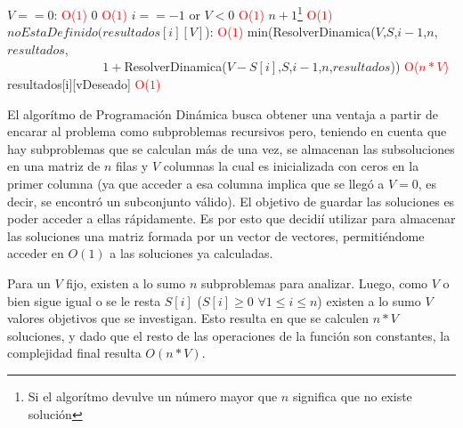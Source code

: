 \begin{codebox}
    \li \If $V == 0$: \textcolor{red}{O($1$)}
        \Then
         \li       \Return $0$ \textcolor{red}{O($1$)}
                \End
    \li \If $i == -1$ or $V<0$  \textcolor{red}{O($1$)}
        \Then
    \li                 \Return $n+1$\footnote{\label{bktrk}Si el algor\'itmo devulve un n\'umero mayor que $n$ significa que no existe soluci\'on} \textcolor{red}{O($1$)}
                \End
    \li \If $noEstaDefinido(resultados[i][V]$):  \textcolor{red}{O($1$)}
        \Then 
    \li          \Return min(ResolverDinamica($V$,$S$,$i-1$,$n$,$resultados$,
                            \\ $\qquad\qquad$$\qquad\quad\,\,$ $1+$ResolverDinamica($V-S[i]$,$S$,$i-1$,$n$,$resultados$)) \textcolor{red}{O($n*V$)}
                            \End
    \li \Return resultados[i][vDeseado]  \textcolor{red}{O($1$)}
    \end{codebox}
\par El algor\'itmo de Programaci\'on Din\'amica busca obtener una ventaja a partir de encarar al problema como
subproblemas recursivos pero, teniendo en cuenta que hay subproblemas que se calculan m\'as de una vez, se 
almacenan las subsoluciones  en una matriz de $n$ filas y $V$ columnas la cual es inicializada con ceros en
la primer columna (ya que acceder a esa columna implica que se lleg\'o a $V=0$, es decir, se encontr\'o un subconjunto v\'alido).
 El objetivo de guardar las soluciones es poder acceder a ellas
r\'apidamente. Es por esto que decidi\'i utilizar para almacenar las soluciones una matriz formada por un vector de 
vectores, permiti\'endome acceder en $O(1)$ a las soluciones ya calculadas.
\par Para un $V$ fijo, existen a lo sumo $n$ subproblemas para analizar. Luego, como $V$ o bien sigue igual o se le resta $S[i]$ ($S[i]\geq 0$ $\forall 1\leq i \leq n$)
existen a lo sumo $V$ valores objetivos que se investigan. Esto resulta en que se calculen $n*V$ soluciones, y dado que el resto de las operaciones de 
la funci\'on son constantes, la complejidad final resulta $O(n*V)$.
